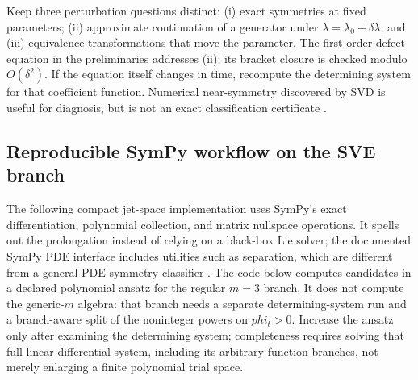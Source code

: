 \documentclass[11pt]{article}
\begin{document}
Keep three perturbation questions distinct: (i) exact symmetries at fixed
parameters; (ii) approximate continuation of a generator under
$\lambda=\lambda_0+\delta\lambda$; and (iii) equivalence transformations that
move the parameter. The first-order defect equation in the preliminaries
addresses (ii); its bracket closure is checked modulo $O(\delta^2)$. If the
equation itself changes in time, recompute the determining system for that
coefficient function. Numerical near-symmetry discovered by SVD is useful for
diagnosis, but is not an exact classification certificate \cite{approxalg}.

\subsection{Reproducible SymPy workflow on the SVE branch}
The following compact jet-space implementation uses SymPy's exact
differentiation, polynomial collection, and matrix nullspace operations. It
spells out the prolongation instead of relying on a black-box Lie solver;
the documented SymPy PDE interface includes utilities such as separation,
which are different from a general PDE symmetry classifier \cite{sympydocs}.
The code below computes candidates in a declared polynomial ansatz for the
regular $m=3$ branch. It does not compute the generic-$m$ algebra: that branch
needs a separate determining-system run and a branch-aware split of the
noninteger powers on $phi_t>0$. Increase the ansatz only after examining the
determining system; completeness requires solving that full linear
differential system, including its arbitrary-function branches, not merely
enlarging a finite polynomial trial space.
\end{document}
